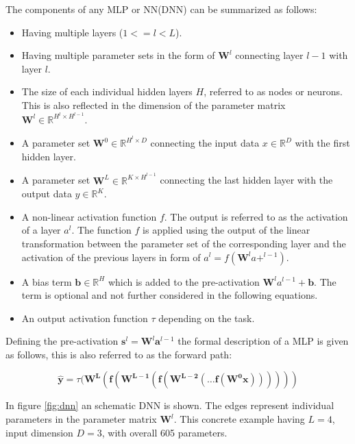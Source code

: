 \documentclass[../main.tex]{subfiles}
\begin{document}
The components of any MLP or NN(DNN) can be summarized as follows:
\begin{itemize} 
    \item Having multiple layers ($1<=l<L$).
    \item Having multiple parameter sets in the form of $\mathbf{W}^l$ connecting layer $l-1$ with layer $l$.
    \item The size of each individual hidden layers $H$, referred to as nodes or neurons. This is also reflected in the dimension of the parameter matrix $\mathbf{W}^l\in\mathbb{R}^{H^l \times H^{l-1}}$. 
    \item A parameter set $\mathbf{W}^0\in{\mathbb{R}^{H^l \times D}}$ connecting the input data $x\in\mathbb{R}^D$ with the first hidden layer.
    \item A parameter set $\mathbf{W}^L\in{\mathbb{R}^{K \times H^{l-1}}}$ connecting the last hidden layer with the output data $y\in\mathbb{R}^K$.     
    \item A non-linear activation function $f$. The output is referred to as the activation of a layer $a^l$. The function $f$ is applied using the output of the linear transformation between the parameter set of the corresponding layer and the activation of the previous layers in form of $a^l=f(\mathbf{W}^l a+^{l-1})$.
    \item A bias term $\mathbf{b}\in\mathbb{R}^{H}$ which is added to the pre-activation $\mathbf{W}^l a^{l-1} + \mathbf{b}$. The term is optional and not further considered in the following equations.
    \item An output activation function $\tau$ depending on the task.
\end{itemize}

Defining the pre-activation $\mathbf{s}^l=\mathbf{W}^l \mathbf{a}^{l-1}$ the formal description of a MLP is given as follows, this is also referred to as the forward path:

\begin{equation}
    \mathbf{\hat{y}}
    =\tau(\mathbf{W^L(f(\mathbf{W^{L-1}(f(\mathbf{W^{L-2}(\dots f(W^0\mathbf{x}))}))}))}
\end{equation}

In figure \ref{fig:dnn} an schematic DNN is shown. The edges represent individual parameters in the parameter matrix $\mathbf{W}^l$. This concrete example having $L=4$, input dimension $D=3$, with overall 605 parameters. 
\end{document}
